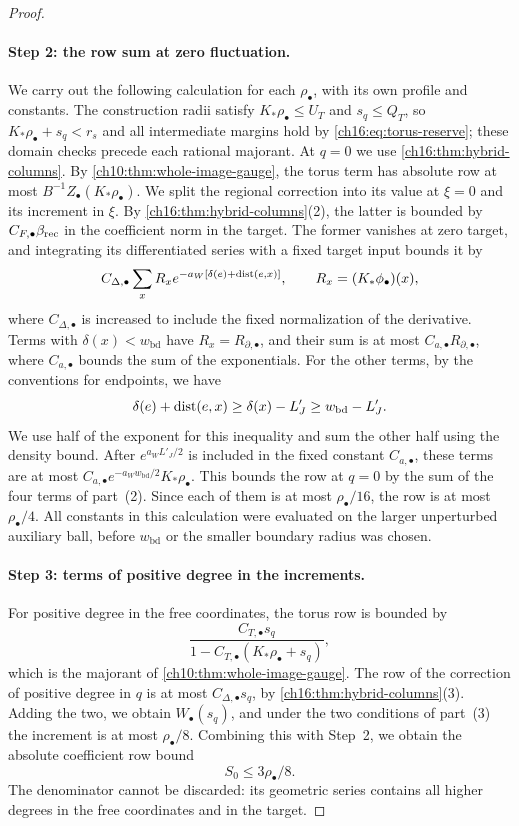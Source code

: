 \begin{proof}
\paragraph{Step 2: the row sum at zero fluctuation.}
We carry out the following calculation for each $\rho_\bullet$, with its own profile and constants. The construction radii satisfy $K_*\rho_\bullet\le U_T$ and $s_q\le Q_T$, so $K_*\rho_\bullet+s_q<r_s$ and all intermediate margins hold by \eqref{ch16:eq:torus-reserve}; these domain checks precede each rational majorant. At $q=0$ we use \cref{ch16:thm:hybrid-columns}. By \cref{ch10:thm:whole-image-gauge}, the torus term has absolute row at most $B^{-1}Z_\bullet(K_*\rho_\bullet)$. We split the regional correction into its value at $\xi=0$ and its increment in $\xi$. By \cref{ch16:thm:hybrid-columns}(2), the latter is bounded by $C_{F,\bullet}\beta_{\mathrm{rec}}$ in the coefficient norm in the target. The former vanishes at zero target, and integrating its differentiated series with a fixed target input bounds it by
\[
 C_{\Delta,\bullet}\sum_x R_x
       e^{-a_W[\delta(e)+\operatorname{dist}(e,x)]},
 \qquad R_x=(K_*\phi_\bullet)(x),
\]
where $C_{\Delta,\bullet}$ is increased to include the fixed normalization of the derivative. Terms with $\delta(x)<w_{\mathrm{bd}}$ have $R_x=R_{\partial,\bullet}$, and their sum is at most $C_{a,\bullet}R_{\partial,\bullet}$, where $C_{a,\bullet}$ bounds the sum of the exponentials. For the other terms, by the conventions for endpoints, we have
\[
 \delta(e)+\operatorname{dist}(e,x)\ge\delta(x)-L'_J
                                          \ge w_{\mathrm{bd}}-L'_J.
\]
We use half of the exponent for this inequality and sum the other half using the density bound. After $e^{a_WL'_J/2}$ is included in the fixed constant $C_{a,\bullet}$, these terms are at most $C_{a,\bullet}e^{-a_Ww_{\mathrm{bd}}/2}K_*\rho_\bullet$. This bounds the row at $q=0$ by the sum of the four terms of part~(2). Since each of them is at most $\rho_\bullet/16$, the row is at most $\rho_\bullet/4$. All constants in this calculation were evaluated on the larger unperturbed auxiliary ball, before $w_{\mathrm{bd}}$ or the smaller boundary radius was chosen.

\paragraph{Step 3: terms of positive degree in the increments.}
For positive degree in the free coordinates, the torus row is bounded by
\[
 \frac{C_{T,\bullet}s_q}
 {1-C_{T,\bullet}(K_*\rho_\bullet+s_q)},
\]
which is the majorant of \cref{ch10:thm:whole-image-gauge}. The row of the correction of positive degree in $q$ is at most $C_{\Delta,\bullet}s_q$, by \cref{ch16:thm:hybrid-columns}(3). Adding the two, we obtain $W_\bullet(s_q)$, and under the two conditions of part~(3) the increment is at most $\rho_\bullet/8$. Combining this with Step~2, we obtain the absolute coefficient row bound
\begin{equation}\label{ch16:eq:zero-exponent-image}
 S_0\le3\rho_\bullet/8.
\end{equation}
The denominator cannot be discarded: its geometric series contains all higher degrees in the free coordinates and in the target.


\end{proof}
